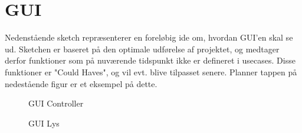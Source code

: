 \section{GUI}
Nedenstående sketch repræsenterer en foreløbig ide om, hvordan GUI’en skal se ud. Sketchen er baseret på den optimale udførelse af projektet, og medtager derfor funktioner som på nuværende tidspunkt ikke er defineret i usecases. Disse funktioner er "Could Haves", og vil evt. blive tilpasset senere. Planner tappen på nedestående figur er et eksempel på dette.

\begin{figure}[H] \centering
    \caption{GUI Controller}
    \label{fig:GUIController}
\end{figure}

\begin{figure}[H] \centering
    \caption{GUI Lys}
    \label{fig:GUILys}
\end{figure}